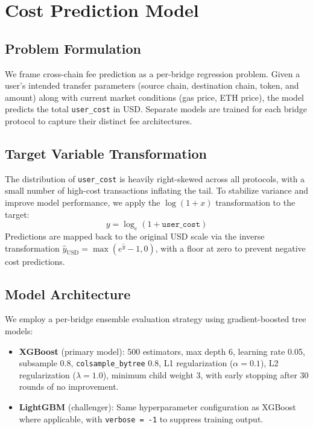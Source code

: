 \section{Cost Prediction Model}\label{sec: pred_model}

\subsection{Problem Formulation}

We frame cross-chain fee prediction as a per-bridge regression problem. Given a user's intended transfer parameters (source chain, destination chain, token, and amount) along with current market conditions (gas price, ETH price), the model predicts the total \texttt{user\_cost} in USD. Separate models are trained for each bridge protocol to capture their distinct fee architectures.

\subsection{Target Variable Transformation}

The distribution of \texttt{user\_cost} is heavily right-skewed across all protocols, with a small number of high-cost transactions inflating the tail. To stabilize variance and improve model performance, we apply the $\log(1+x)$ transformation to the target:
\begin{equation}
    y = \log_e(1 + \texttt{user\_cost})
\end{equation}
Predictions are mapped back to the original USD scale via the inverse transformation $\hat{y}_{\text{USD}} = \max(e^{\hat{y}} - 1, 0)$, with a floor at zero to prevent negative cost predictions.

\subsection{Model Architecture}

We employ a per-bridge ensemble evaluation strategy using gradient-boosted tree models:

\begin{itemize}
    \item \textbf{XGBoost} (primary model): 500 estimators, max depth 6, learning rate 0.05, subsample 0.8, \texttt{colsample\_bytree} 0.8, L1 regularization ($\alpha = 0.1$), L2 regularization ($\lambda = 1.0$), minimum child weight 3, with early stopping after 30 rounds of no improvement.
    \item \textbf{LightGBM} (challenger): Same hyperparameter configuration as XGBoost where applicable, with \texttt{verbose = -1} to suppress training output.
\end{itemize}

